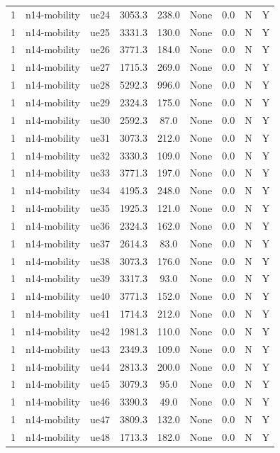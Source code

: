\begin{table}[ht]
\begin{tabular}{|c|c|c|c|c|c|c|c|c|}
1 & n14-mobility & ue24 & 3053.3 & 238.0 & None & 0.0 & N & Y \\
1 & n14-mobility & ue25 & 3331.3 & 130.0 & None & 0.0 & N & Y \\
1 & n14-mobility & ue26 & 3771.3 & 184.0 & None & 0.0 & N & Y \\
1 & n14-mobility & ue27 & 1715.3 & 269.0 & None & 0.0 & N & Y \\
1 & n14-mobility & ue28 & 5292.3 & 996.0 & None & 0.0 & N & Y \\
1 & n14-mobility & ue29 & 2324.3 & 175.0 & None & 0.0 & N & Y \\
1 & n14-mobility & ue30 & 2592.3 & 87.0 & None & 0.0 & N & Y \\
1 & n14-mobility & ue31 & 3073.3 & 212.0 & None & 0.0 & N & Y \\
1 & n14-mobility & ue32 & 3330.3 & 109.0 & None & 0.0 & N & Y \\
1 & n14-mobility & ue33 & 3771.3 & 197.0 & None & 0.0 & N & Y \\
1 & n14-mobility & ue34 & 4195.3 & 248.0 & None & 0.0 & N & Y \\
1 & n14-mobility & ue35 & 1925.3 & 121.0 & None & 0.0 & N & Y \\
1 & n14-mobility & ue36 & 2324.3 & 162.0 & None & 0.0 & N & Y \\
1 & n14-mobility & ue37 & 2614.3 & 83.0 & None & 0.0 & N & Y \\
1 & n14-mobility & ue38 & 3073.3 & 176.0 & None & 0.0 & N & Y \\
1 & n14-mobility & ue39 & 3317.3 & 93.0 & None & 0.0 & N & Y \\
1 & n14-mobility & ue40 & 3771.3 & 152.0 & None & 0.0 & N & Y \\
1 & n14-mobility & ue41 & 1714.3 & 212.0 & None & 0.0 & N & Y \\
1 & n14-mobility & ue42 & 1981.3 & 110.0 & None & 0.0 & N & Y \\
1 & n14-mobility & ue43 & 2349.3 & 109.0 & None & 0.0 & N & Y \\
1 & n14-mobility & ue44 & 2813.3 & 200.0 & None & 0.0 & N & Y \\
1 & n14-mobility & ue45 & 3079.3 & 95.0 & None & 0.0 & N & Y \\
1 & n14-mobility & ue46 & 3390.3 & 49.0 & None & 0.0 & N & Y \\
1 & n14-mobility & ue47 & 3809.3 & 132.0 & None & 0.0 & N & Y \\
1 & n14-mobility & ue48 & 1713.3 & 182.0 & None & 0.0 & N & Y \\

\end{tabular}
\end{table}
